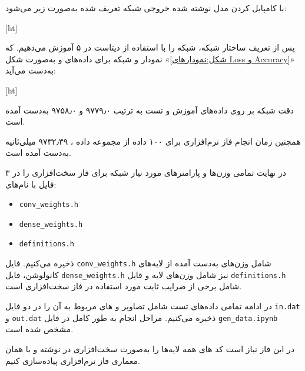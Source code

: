 با کامپایل کردن مدل نوشته شده خروجی شبکه تعریف شده به‌صورت زیر می‌شود:


[ht]



پس از تعریف ساختار شبکه، شبکه را با استفاده از دیتاست  در ۵  آموزش می‌دهیم. که نمودار  و  شبکه برای داده‌های  و  به‌صورت شکل «\ref{شکل:نمودارهای Loss و Accuracy}» به‌دست می‌آید:


[ht]



دقت شبکه بر روی داده‌های آموزش و تست به ترتیب ۹۷۷۹٫۰ و ۹۷۵۸٫۰ به‌دست آمده است.

همچنین زمان انجام فاز  نرم‌افزاری برای ۱۰۰ داده از مجموعه داده ، ۹۷۳۲٫۳۹ میلی‌ثانیه به‌دست آمده است.

در نهایت تمامی وزن‌ها و پارامتر‌های مورد نیاز شبکه برای فاز سخت‌افزاری را در ۳ فایل با نام‌های:

\begin{latin}
	\begin{itemize}
		\item 
		\texttt{conv\_weights.h}
		
		\item 
		\texttt{dense\_weights.h}
		
		\item 
		\texttt{definitions.h}
	\end{itemize}
\end{latin}


ذخیره می‌کنیم. فایل \texttt{conv\_weights.h} شامل وزن‌های به‌دست آمده از لایه‌های کانولوشن، فایل \texttt{dense\_weights.h} نیز شامل وزن‌های لایه  و فایل \texttt{definitions.h} شامل برخی از ضرایب ثابت مورد استفاده در فاز سخت‌افزاری است.

در ادامه تمامی داده‌های تست  شامل تصاویر و  های مربوط به آن را در دو فایل \texttt{in.dat} و \texttt{out.dat} ذخیره می‌کنیم. مراحل انجام به طور کامل در فایل \texttt{gen\_data.ipynb} مشخص شده است.






در این فاز نیاز است کد های همه لایه‌ها را به‌صورت سخت‌افزاری در  نوشته و با همان معماری فاز نرم‌افزاری پیاده‌سازی کنیم.


